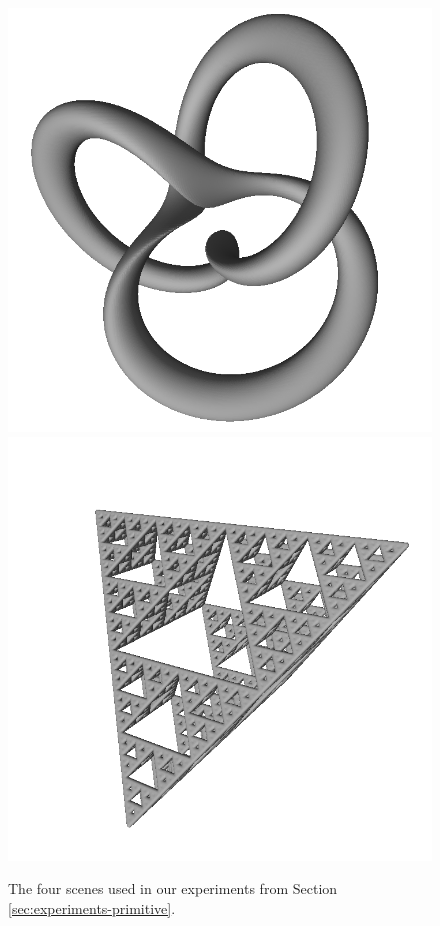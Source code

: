 \documentclass[11pt,twocolumn]{article}
\begin{document}
\begin{figure}
{			}
			\resizebox{0.5\textwidth}{!}
			{
				\includegraphics{knot.png}
				\includegraphics{sierp.png}
			}
			\caption
			{
				The four scenes used in our experiments from Section \ref{sec:experiments-primitive}.
			}
			\label{fig:primitive-scenes}
		\end{figure}
\end{document}
